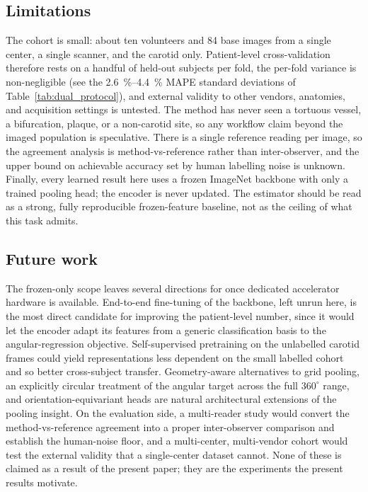 \subsection{Limitations}

The cohort is small: about ten volunteers and \num{84} base images from a single
center, a single scanner, and the carotid only. Patient-level cross-validation
therefore rests on a handful of held-out subjects per fold, the per-fold variance is
non-negligible (see the \SIrange{2.6}{4.4}{\percent} MAPE standard deviations of
Table~\ref{tab:dual_protocol}), and external validity to other vendors, anatomies,
and acquisition settings is untested. The method has never seen a tortuous vessel, a
bifurcation, plaque, or a non-carotid site, so any workflow claim beyond the imaged
population is speculative. There is a single reference reading per image, so the
agreement analysis is method-vs-reference rather than inter-observer, and the upper
bound on achievable accuracy set by human labelling noise is unknown. Finally, every
learned result here uses a frozen ImageNet backbone with only a trained pooling head;
the encoder is never updated. The estimator should be read as a strong, fully
reproducible frozen-feature baseline, not as the ceiling of what this task admits.

\subsection{Future work}

The frozen-only scope leaves several directions for once dedicated accelerator
hardware is available. End-to-end fine-tuning of the backbone, left unrun here, is
the most direct candidate for improving the patient-level number, since it would let
the encoder adapt its features from a generic classification basis to the
angular-regression objective. Self-supervised pretraining on the unlabelled carotid
frames could yield representations less dependent on the small labelled cohort and so
better cross-subject transfer. Geometry-aware alternatives to grid pooling, an
explicitly circular treatment of the angular target across the full $360^{\circ}$
range, and orientation-equivariant heads are natural architectural extensions of the
pooling insight. On the evaluation side, a multi-reader study would convert the
method-vs-reference agreement into a proper inter-observer comparison and establish
the human-noise floor, and a multi-center, multi-vendor cohort would test the
external validity that a single-center dataset cannot. None of these is claimed as a
result of the present paper; they are the experiments the present results motivate.


